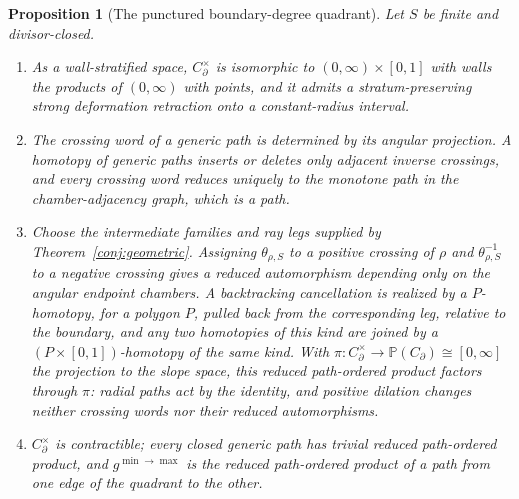 \documentclass[11pt]{amsart}
\newtheorem{proposition}[theorem]{Proposition}
\theoremstyle{definition}
\theoremstyle{remark}
\begin{document}
\begin{proposition}[The punctured boundary-degree quadrant]
\label{thm:positionobstruction7}
Let $S$ be finite and divisor-closed.
\begin{enumerate}
\item As a wall-stratified space, $C_\partial^\times$ is isomorphic to
$(0,\infty)\times[0,1]$ with walls the products of $(0,\infty)$ with points,
and it admits a stratum-preserving strong deformation retraction onto a
constant-radius interval.
\item The crossing word of a generic path is determined by its angular
projection.  A homotopy of generic paths inserts or deletes only adjacent inverse
crossings, and every crossing word reduces uniquely to the monotone path in
the chamber-adjacency graph, which is a path.
\item Choose the intermediate families and ray legs supplied by
Theorem~\ref{conj:geometric}.  Assigning $\theta_{\rho,S}$ to a positive
crossing of $\rho$ and $\theta_{\rho,S}^{-1}$ to a negative crossing gives a
reduced automorphism depending only on the angular endpoint chambers.  A
backtracking cancellation is realized by a $P$-homotopy, for a polygon $P$,
pulled back from the corresponding leg, relative to the boundary, and any
two homotopies of this kind are joined by a $(P\times[0,1])$-homotopy of the
same kind.  With $\pi:C_\partial^\times\to\mathbb P(C_\partial)\cong[0,\infty]$ the
projection to the slope space, this reduced path-ordered product factors
through $\pi$: radial paths act by the identity, and positive dilation changes
neither crossing words nor their reduced automorphisms.
\item $C_\partial^\times$ is contractible; every closed generic path has
trivial reduced path-ordered product, and $g^{\min\to\max}$ is the reduced
path-ordered product of a path from one edge of the quadrant to the other.
\end{enumerate}
\end{proposition}
\end{document}
